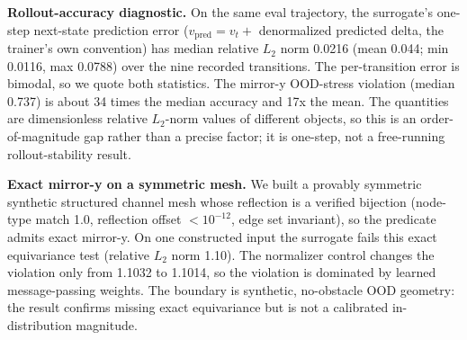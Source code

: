 \documentclass[preprint,12pt]{elsarticle}
\begin{document}
\textbf{Rollout-accuracy diagnostic.} On the same eval trajectory, the surrogate's one-step next-state prediction error ($v_\mathrm{pred}=v_t+$ denormalized predicted delta, the trainer's own convention) has median relative \(L_2\) norm 0.0216 (mean 0.044; min 0.0116, max 0.0788) over the nine recorded transitions. The per-transition error is bimodal, so we quote both statistics. The mirror-y OOD-stress violation (median 0.737) is about 34 times the median accuracy and 17x the mean. The quantities are dimensionless relative \(L_2\)-norm values of different objects, so this is an order-of-magnitude gap rather than a precise factor; it is one-step, not a free-running rollout-stability result.

\textbf{Exact mirror-y on a symmetric mesh.} We built a provably symmetric synthetic structured channel mesh whose reflection is a verified bijection (node-type match 1.0, reflection offset $<10^{-12}$, edge set invariant), so the predicate admits exact mirror-y. On one constructed input the surrogate fails this exact equivariance test (relative \(L_2\) norm 1.10). The normalizer control changes the violation only from 1.1032 to 1.1014, so the violation is dominated by learned message-passing weights. The boundary is synthetic, no-obstacle OOD geometry: the result confirms missing exact equivariance but is not a calibrated in-distribution magnitude.
\end{document}
